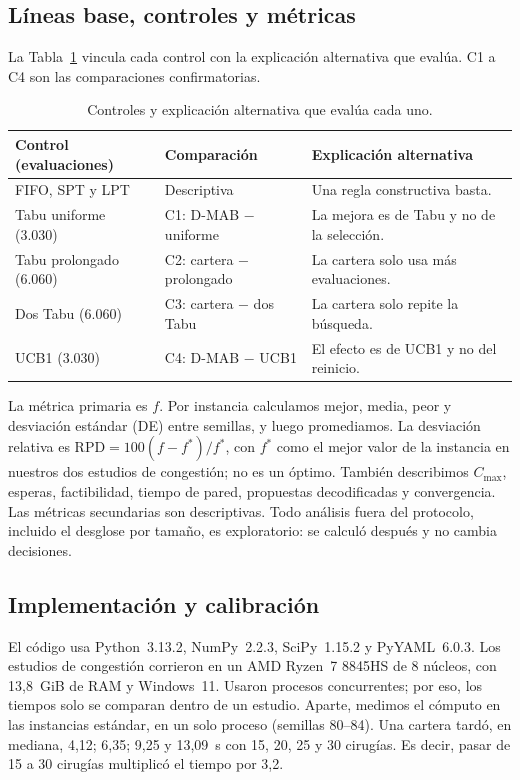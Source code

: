\subsection{Líneas base, controles y métricas}
\label{subsec:controles}
La Tabla~\ref{tab:lineas-base} vincula cada control con la explicación alternativa
que evalúa. C1 a C4 son las comparaciones confirmatorias.

\begin{table}[!ht]
 \centering\footnotesize
 \caption{Controles y explicación alternativa que evalúa cada uno.}
 \label{tab:lineas-base}
 \begin{tabular}{@{}p{}p{}p{}@{}}
  \toprule
  Control (evaluaciones) & Comparación & Explicación alternativa\\
  \midrule
  FIFO, SPT y LPT & Descriptiva & Una regla constructiva basta.\\
  Tabu uniforme (3.030) & C1: D-MAB $-$ uniforme & La mejora es de Tabu y no de la selección.\\
  Tabu prolongado (6.060) & C2: cartera $-$ prolongado & La cartera solo usa más evaluaciones.\\
  Dos Tabu (6.060) & C3: cartera $-$ dos Tabu & La cartera solo repite la búsqueda.\\
  UCB1 (3.030) & C4: D-MAB $-$ UCB1 & El efecto es de UCB1 y no del reinicio.\\
  \bottomrule
 \end{tabular}
\end{table}

La métrica primaria es $f$. Por instancia calculamos mejor, media, peor y desviación
estándar (DE) entre semillas, y luego promediamos. La desviación relativa es
$\mathrm{RPD}=100(f-f^*)/f^*$, con $f^*$ como el mejor valor de la instancia en
nuestros dos estudios de congestión; no es un óptimo. También describimos
$C_{\max}$, esperas, factibilidad, tiempo de pared, propuestas decodificadas y
convergencia. Las métricas secundarias son descriptivas. Todo análisis fuera del
protocolo, incluido el desglose por tamaño, es exploratorio: se calculó después y no
cambia decisiones.

\subsection{Implementación y calibración}
\label{subsec:implementacion}
El código usa Python~3.13.2, NumPy~2.2.3, SciPy~1.15.2 y PyYAML~6.0.3. Los estudios de
congestión corrieron en un AMD Ryzen~7 8845HS de 8 núcleos, con 13,8~GiB de RAM y
Windows~11. Usaron procesos concurrentes; por eso, los tiempos solo se comparan dentro de un estudio.
Aparte, medimos el cómputo en las instancias estándar, en un solo proceso (semillas
80--84). Una cartera tardó, en mediana, 4,12; 6,35; 9,25 y 13,09~s con 15, 20, 25 y 30
cirugías. Es decir, pasar de 15 a 30 cirugías multiplicó el tiempo por 3,2.

